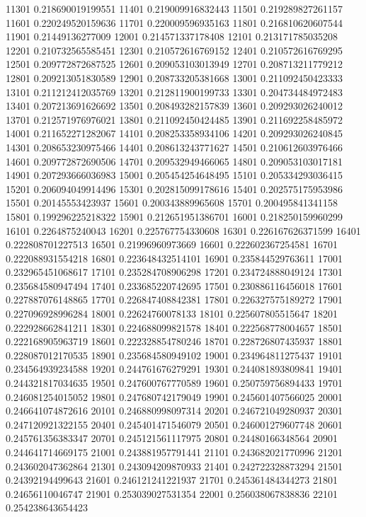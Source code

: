 {11301 0.218690019199551
11401 0.219009916832443
11501 0.219289827261157
11601 0.220249520159636
11701 0.220009596935163
11801 0.216810620607544
11901 0.21449136277009
12001 0.214571337178408
12101 0.213171785035208
12201 0.210732565585451
12301 0.210572616769152
12401 0.210572616769295
12501 0.209772872687525
12601 0.209053103013949
12701 0.208713211779212
12801 0.209213051830589
12901 0.208733205381668
13001 0.211092450423333
13101 0.211212412035769
13201 0.212811900199733
13301 0.204734484972483
13401 0.207213691626692
13501 0.208493282157839
13601 0.209293026240012
13701 0.212571976976021
13801 0.211092450424485
13901 0.211692258485972
14001 0.211652271282067
14101 0.208253358934106
14201 0.209293026240845
14301 0.208653230975466
14401 0.208613243771627
14501 0.210612603976466
14601 0.209772872690506
14701 0.209532949466065
14801 0.209053103017181
14901 0.207293666036983
15001 0.205454254648495
15101 0.205334293036415
15201 0.206094049914496
15301 0.202815099178616
15401 0.202575175953986
15501 0.20145553423937
15601 0.200343889965608
15701 0.200495841341158
15801 0.199296225218322
15901 0.212651951386701
16001 0.218250159960299
16101 0.2264875240043
16201 0.225767754330608
16301 0.226167626371599
16401 0.222808701227513
16501 0.21996960973669
16601 0.222602367254581
16701 0.222088931554218
16801 0.223648432514101
16901 0.235844529763611
17001 0.232965451068617
17101 0.235284708906298
17201 0.234724888049124
17301 0.235684580947494
17401 0.233685220742695
17501 0.230886116456018
17601 0.227887076148865
17701 0.226847408842381
17801 0.226327575189272
17901 0.227096928996284
18001 0.22624760078133
18101 0.225607805515647
18201 0.222928662841211
18301 0.224688099821578
18401 0.222568778004657
18501 0.222168905963719
18601 0.222328854780246
18701 0.228726807435937
18801 0.228087012170535
18901 0.235684580949102
19001 0.234964811275437
19101 0.234564939234588
19201 0.244761676279291
19301 0.244081893809841
19401 0.244321817034635
19501 0.247600767770589
19601 0.250759756894433
19701 0.246081254015052
19801 0.247680742179049
19901 0.245601407566025
20001 0.246641074872616
20101 0.246880998097314
20201 0.246721049280937
20301 0.247120921322155
20401 0.245401471546079
20501 0.246001279607748
20601 0.245761356383347
20701 0.245121561117975
20801 0.24480166348564
20901 0.244641714669175
21001 0.243881957791441
21101 0.243682021770996
21201 0.243602047362864
21301 0.243094209870933
21401 0.242722328873294
21501 0.24392194499643
21601 0.246121241221937
21701 0.245361484344273
21801 0.24656110046747
21901 0.253039027531354
22001 0.256038067838836
22101 0.254238643654423
}

